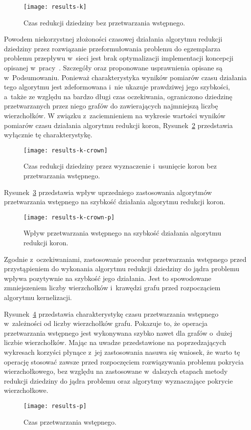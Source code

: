   \begin{figure}
    \centering
      \texttt{[image: results-k]}
      \caption{Czas redukcji dziedziny bez przetwarzania wstępnego.}
    \label{fig_results_k}
  \end{figure}

  Powodem niekorzystnej złożoności czasowej działania algorytmu redukcji dziedziny przez rozwiązanie przeformułowania problemu do egzemplarza problemu przepływu w~sieci jest brak optymalizacji implementacji koncepcji opisanej w~pracy~\cite{KernelizationAlgorithms04}.
  Szczegóły oraz proponowane usprawnienia opisane są w~Podsumowaniu.
  Ponieważ charakterystyka wyników pomiarów czasu działania tego algorytmu jest zdeformowana i~nie ukazuje prawdziwej jego szybkości, a~także ze względu na bardzo długi czas oczekiwania, ograniczono dziedzinę przetwarzanych przez niego grafów do zawierających najmniejszą liczbę wierzchołków.
  W związku z~zaciemnieniem na wykresie wartości wyników pomiarów czasu działania algorytmu redukcji koron, Rysunek~\ref{fig_results_k_crown} przedstawia wyłącznie tę charakterystykę.

  \begin{figure}
    \centering
      \texttt{[image: results-k-crown]}
    \caption{Czas redukcji dziedziny przez wyznaczenie i~usunięcie koron bez przetwarzania wstępnego.}
    \label{fig_results_k_crown}
  \end{figure}

  Rysunek~\ref{fig_results_k_crown_p} przedstawia wpływ uprzedniego zastosowania algorytmów przetwarzania wstępnego na szybkość działania algorytmu redukcji koron.
  \begin{figure}
    \centering
      \texttt{[image: results-k-crown-p]}
    \caption{Wpływ przetwarzania wstępnego na szybkość działania algorytmu redukcji koron.}
    \label{fig_results_k_crown_p}
  \end{figure}

  Zgodnie z~oczekiwaniami, zastosowanie procedur przetwarzania wstępnego przed przystąpieniem do wykonania algorytmu redukcji dziedziny do jądra problemu wpływa pozytywnie na szybkość jego działania.
  Jest to spowodowane zmniejszeniem liczby wierzchołków i~krawędzi grafu przed rozpocząciem algorytmu kernelizacji.

  Rysunek~\ref{fig_results_p} przedstawia charakterystykę czasu przetwarzania wstępnego w~zależności od liczby wierzchołków grafu.
  Pokazuje to, że operacja przetwarzania wstępnego jest wykonywana szybko nawet dla grafów o~dużej liczbie wierzchołków. Mając na uwadze przedstawione na poprzedzających wykresach korzyści płynące z~jej zastosowania nasuwa się wniosek, że warto tę operację stosować zawsze przed rozpoczęciem rozwiązywania problemu pokrycia wierzchołkowego, bez względu na zastosowane w~dalszych etapach metody redukcji dziedziny do jądra problemu oraz algorytmy wyznaczające pokrycie wierzchołkowe.
  \begin{figure}
    \label{fig_results_p}
    \centering
      \texttt{[image: results-p]}
    \caption{Czas przetwarzania wstępnego.}
  \end{figure}
